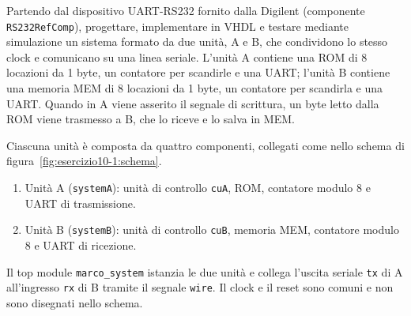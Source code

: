 \label{sec:esercizio10-1}

\begin{traccia}
Partendo dal dispositivo UART-RS232 fornito dalla Digilent (componente \texttt{RS232RefComp}), progettare, implementare in VHDL e testare mediante simulazione un sistema formato da due unità, A e B, che condividono lo stesso clock e comunicano su una linea seriale. L'unità A contiene una ROM di 8 locazioni da 1 byte, un contatore per scandirle e una UART; l'unità B contiene una memoria MEM di 8 locazioni da 1 byte, un contatore per scandirla e una UART. Quando in A viene asserito il segnale di scrittura, un byte letto dalla ROM viene trasmesso a B, che lo riceve e lo salva in MEM.
\end{traccia}

\progetto

Ciascuna unità è composta da quattro componenti, collegati come nello schema di figura~\ref{fig:esercizio10-1:schema}.
\begin{enumerate}
  \item Unità A (\texttt{systemA}): unità di controllo \texttt{cuA}, ROM, contatore modulo 8 e UART di trasmissione.
  \item Unità B (\texttt{systemB}): unità di controllo \texttt{cuB}, memoria MEM, contatore modulo 8 e UART di ricezione.
\end{enumerate}
Il top module \texttt{marco\_system} istanzia le due unità e collega l'uscita seriale \texttt{tx} di A all'ingresso \texttt{rx} di B tramite il segnale \texttt{wire}. Il clock e il reset sono comuni e non sono disegnati nello schema.

